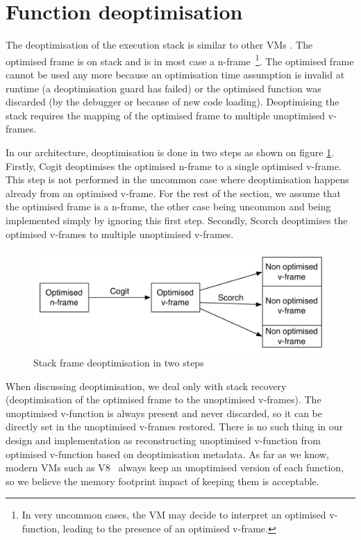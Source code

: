\documentclass[a4paper,12pt,twoside]{../includes/ThesisStyle}
\begin{document}

\section {Function deoptimisation}
\label{sec:functionDeoptimisation}

The deoptimisation of the execution stack is similar to other VMs \cite{Fin03a, Holz92a}. The optimised frame is on stack and is in most case a n-frame~\footnote{In very uncommon cases, the VM may decide to interpret an optimised v-function, leading to the presence of an optimised v-frame.}. The optimised frame cannot be used any more because an optimisation time assumption is invalid at runtime (a deoptimisation guard has failed) or the optimised function was discarded (by the debugger or because of new code loading). Deoptimising the stack requires the mapping of the optimised frame to multiple unoptimised v-frames. 

In our architecture, deoptimisation is done in two steps as shown on figure \ref{fig:SFDeoptimisation}. Firstly, Cogit deoptimises the optimised n-frame to a single optimised v-frame. This step is not performed in the uncommon case where deoptimisation happens already from an optimised v-frame. For the rest of the section, we assume that the optimised frame is a n-frame, the other case being uncommon and being implemented simply by ignoring this first step. Secondly, Scorch deoptimises the optimised v-frames to multiple unoptimised v-frames.

\begin{figure}[h!]
    \begin{center}
        \includegraphics[width=0.8\linewidth]{SFDeoptimisation}
        \caption{Stack frame deoptimisation in two steps}
        \label{fig:SFDeoptimisation}
    \end{center}
\end{figure}

When discussing deoptimisation, we deal only with stack recovery (deoptimisation of the optimised frame to the unoptimised v-frames). The unoptimised v-function is always present and never discarded, so it can be directly set in the unoptimised v-frames restored. There is no such thing in our design and implementation as reconstructing unoptimised v-function from optimised v-function based on deoptimisation metadata. As far as we know, modern VMs such as V8~\cite{V8} always keep an unoptimised version of each function, so we believe the memory footprint impact of keeping them is acceptable.
\end{document}
